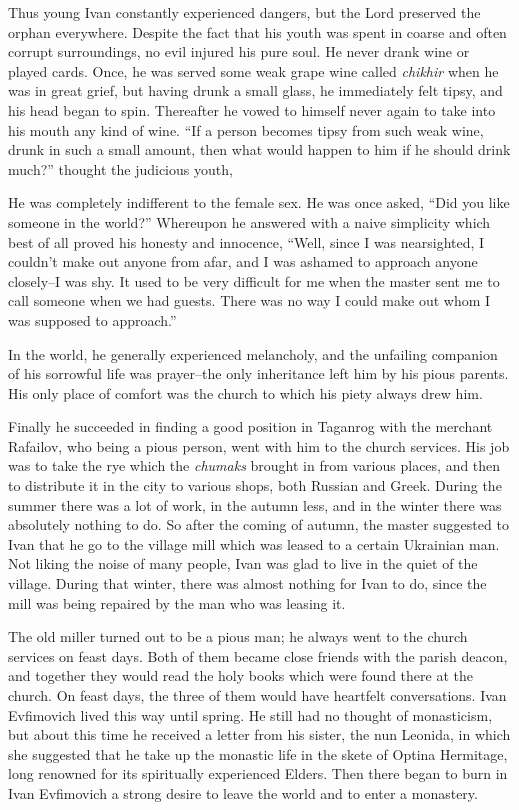 Thus young Ivan constantly experienced dangers, but the Lord preserved the orphan everywhere. Despite the fact that his youth was spent in coarse and often corrupt surroundings, no evil injured his pure soul. He never drank wine or played cards. Once, he was served some weak grape wine called \textit{chikhir} when he was in great grief, but having drunk a small glass, he immediately felt tipsy, and his head began to spin. Thereafter he vowed to himself never again to take into his mouth any kind of wine. ``If a person becomes tipsy from such weak wine, drunk in such a small amount, then what would happen to him if he should drink much?'' thought the judicious youth,

He was completely indifferent to the female sex. He was once asked, ``Did you like someone in the world?'' Whereupon he answered with a naive simplicity which best of all proved his honesty and innocence, ``Well, since I was nearsighted, I couldn't make out anyone from afar, and I was ashamed to approach anyone closely--I was shy. It used to be very difficult for me when the master sent me to call someone when we had guests. There was no way I could make out whom I was supposed to approach.''

In the world, he generally experienced melancholy, and the unfailing companion of his sorrowful life was prayer--the only inheritance left him by his pious parents. His only place of comfort was the church to which his piety always drew him.

Finally he succeeded in finding a good position in Taganrog with the merchant Rafailov, who being a pious person, went with him to the church services. His job was to take the rye which the \textit{chumaks} brought in from various places, and then to distribute it in the city to various shops, both Russian and Greek. During the summer there was a lot of work, in the autumn less, and in the winter there was absolutely nothing to do. So after the coming of autumn, the master suggested to Ivan that he go to the village mill which was leased to a certain Ukrainian man. Not liking the noise of many people, Ivan was glad to live in the quiet of the village. During that winter, there was almost nothing for Ivan to do, since the mill was being repaired by the man who was leasing it.

The old miller turned out to be a pious man; he always went to the church services on feast days. Both of them became close friends with the parish deacon, and together they would read the holy books which were found there at the church. On feast days, the three of them would have heartfelt conversations. Ivan Evfimovich lived this way until spring. He still had no thought of monasticism, but about this time he received a letter from his sister, the nun Leonida, in which she suggested that he take up the monastic life in the skete of Optina Hermitage, long renowned for its spiritually experienced Elders. Then there began to burn in Ivan Evfimovich a strong desire to leave the world and to enter a monastery.

